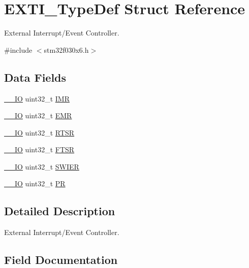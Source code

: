 \hypertarget{struct_e_x_t_i___type_def}{}\section{E\+X\+T\+I\+\_\+\+Type\+Def Struct Reference}
\label{struct_e_x_t_i___type_def}


External Interrupt/\+Event Controller.  




{\ttfamily \#include $<$stm32f030x6.\+h$>$}

\subsection*{Data Fields}
\begin{DoxyCompactItemize}
\item 
\hyperlink{core__sc300_8h_aec43007d9998a0a0e01faede4133d6be}{\+\_\+\+\_\+\+IO} uint32\+\_\+t \hyperlink{struct_e_x_t_i___type_def_ae845b86e973b4bf8a33c447c261633f6}{I\+MR}
\item 
\hyperlink{core__sc300_8h_aec43007d9998a0a0e01faede4133d6be}{\+\_\+\+\_\+\+IO} uint32\+\_\+t \hyperlink{struct_e_x_t_i___type_def_a6034c7458d8e6030f6dacecf0f1a3a89}{E\+MR}
\item 
\hyperlink{core__sc300_8h_aec43007d9998a0a0e01faede4133d6be}{\+\_\+\+\_\+\+IO} uint32\+\_\+t \hyperlink{struct_e_x_t_i___type_def_a0d952a17455687d6e9053730d028fa1d}{R\+T\+SR}
\item 
\hyperlink{core__sc300_8h_aec43007d9998a0a0e01faede4133d6be}{\+\_\+\+\_\+\+IO} uint32\+\_\+t \hyperlink{struct_e_x_t_i___type_def_aa0f7c828c46ae6f6bc9f66f11720bbe6}{F\+T\+SR}
\item 
\hyperlink{core__sc300_8h_aec43007d9998a0a0e01faede4133d6be}{\+\_\+\+\_\+\+IO} uint32\+\_\+t \hyperlink{struct_e_x_t_i___type_def_a9eae93b6cc13d4d25e12f2224e2369c9}{S\+W\+I\+ER}
\item 
\hyperlink{core__sc300_8h_aec43007d9998a0a0e01faede4133d6be}{\+\_\+\+\_\+\+IO} uint32\+\_\+t \hyperlink{struct_e_x_t_i___type_def_af8d25514079514d38c104402f46470af}{PR}
\end{DoxyCompactItemize}


\subsection{Detailed Description}
External Interrupt/\+Event Controller. 

\subsection{Field Documentation}
\mbox{\label{struct_e_x_t_i___type_def_a6034c7458d8e6030f6dacecf0f1a3a89}} 
